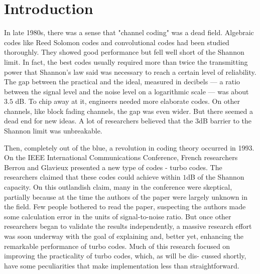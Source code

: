 \Contributor{}

\lstset{style=mystyle}

	\MakeScribeTop


\section{Introduction}
In late 1980s, there was a sense that "channel coding" was a dead field. Algebraic codes like Reed Solomon codes and convolutional codes had been studied thoroughly. They showed good performance but fell well short of the Shannon limit.  In fact, the best codes usually required more than twice the transmitting power that Shannon’s law said was necessary to reach a certain level of reliability. The gap between the practical and the ideal, measured in decibels — a ratio between the signal level and the noise level on a logarithmic scale — was about $3.5$ dB. To chip away at it, engineers needed more elaborate codes. On other channels, like block fading channels, the gap was even wider. But there seemed a dead end for new ideas. A lot of researchers believed that the $3$dB barrier to the Shannon limit was unbreakable.


Then, completely out of the blue, a revolution in coding theory occurred in 1993. On the IEEE International Communications Conference, French researchers Berrou and Glavieux presented a new type of codes - turbo codes. The researchers claimed that these codes could achieve within $1$dB of the Shannon capacity. On this outlandish claim, many in the conference were skeptical, partially because at the time the authors of the paper were largely unknown in the field. Few people bothered to read the paper, suspecting the authors made some calculation error in the units of signal-to-noise ratio. But once other researchers began to validate the results independently, a massive research effort was soon underway with the goal of explaining and, better yet, enhancing the remarkable performance of turbo codes. Much of this research focused on improving the practicality of turbo codes, which, as will be dis- cussed shortly, have some peculiarities that make implementation less than straightforward.

